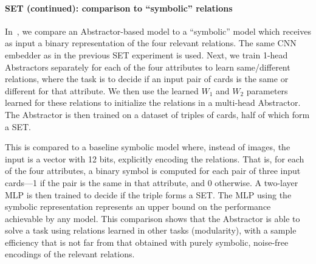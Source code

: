 \paragraph{SET (continued): comparison to ``symbolic'' relations}
In~, we compare an Abstractor-based model to a ``symbolic'' model which receives as input a binary representation of the four relevant relations. The same CNN embedder as in the previous SET experiment is used. Next, we train 1-head Abstractors separately for each of the four attributes to learn same/different relations, where the task is to decide if an input pair of cards is the same or different for that attribute. We then use the learned $W_1$ and $W_2$ parameters learned for these relations to initialize the relations in a multi-head Abstractor. The Abstractor is then trained on a dataset of triples of cards, half of which form a SET.

This is compared to a baseline symbolic model where, instead of images, the input is a vector with 12 bits,
explicitly encoding the relations. That is, for each of the four attributes, a binary symbol is computed for each pair of three input cards---1 if the pair is the same in that attribute, and 0 otherwise. A two-layer MLP is then trained to decide if the triple forms a SET. The MLP using the symbolic representation represents an upper bound on the performance achievable by any model. This comparison shows that the Abstractor is able to solve a task using relations learned in other tasks (modularity), with a sample efficiency that is not far from that obtained with purely symbolic, noise-free encodings of the relevant relations.



